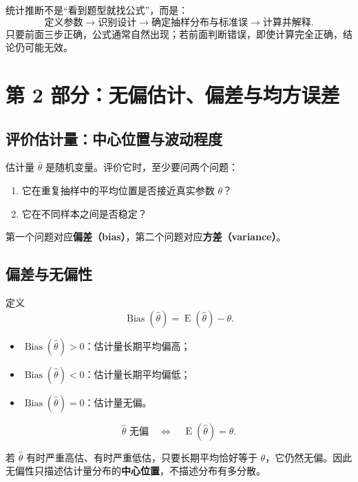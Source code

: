 \documentclass[11pt,a4paper]{article}
\newcommand{\E}{\operatorname{E}}
\newcommand{\Bias}{\operatorname{Bias}}
\begin{document}
\begin{summarybox}[第 1 部分的核心]
统计推断不是“看到题型就找公式”，而是：
\[
  \boxed{
  \text{定义参数}
  \longrightarrow
  \text{识别设计}
  \longrightarrow
  \text{确定抽样分布与标准误}
  \longrightarrow
  \text{计算并解释}.
  }
\]
只要前面三步正确，公式通常自然出现；若前面判断错误，即使计算完全正确，结论仍可能无效。
\end{summarybox}

\section{第 2 部分：无偏估计、偏差与均方误差}

\subsection{评价估计量：中心位置与波动程度}

估计量 $\hat\theta$ 是随机变量。评价它时，至少要问两个问题：
\begin{enumerate}
  \item 它在重复抽样中的平均位置是否接近真实参数 $\theta$？
  \item 它在不同样本之间是否稳定？
\end{enumerate}

第一个问题对应\textbf{偏差（bias）}，第二个问题对应\textbf{方差（variance）}。

\subsection{偏差与无偏性}

定义
\[
  \boxed{
  \Bias(\hat\theta)
  =
  \E(\hat\theta)-\theta.
  }
\]

\begin{itemize}
  \item $\Bias(\hat\theta)>0$：估计量长期平均偏高；
  \item $\Bias(\hat\theta)<0$：估计量长期平均偏低；
  \item $\Bias(\hat\theta)=0$：估计量无偏。
\end{itemize}

\[
  \boxed{
  \hat\theta\text{ 无偏}
  \quad\Longleftrightarrow\quad
  \E(\hat\theta)=\theta.
  }
\]

\begin{intuitionbox}[无偏不代表每次都估得准确]
若 $\hat\theta$ 有时严重高估、有时严重低估，只要长期平均恰好等于 $\theta$，它仍然无偏。因此无偏性只描述估计量分布的\textbf{中心位置}，不描述分布有多分散。
\end{intuitionbox}
\end{document}
